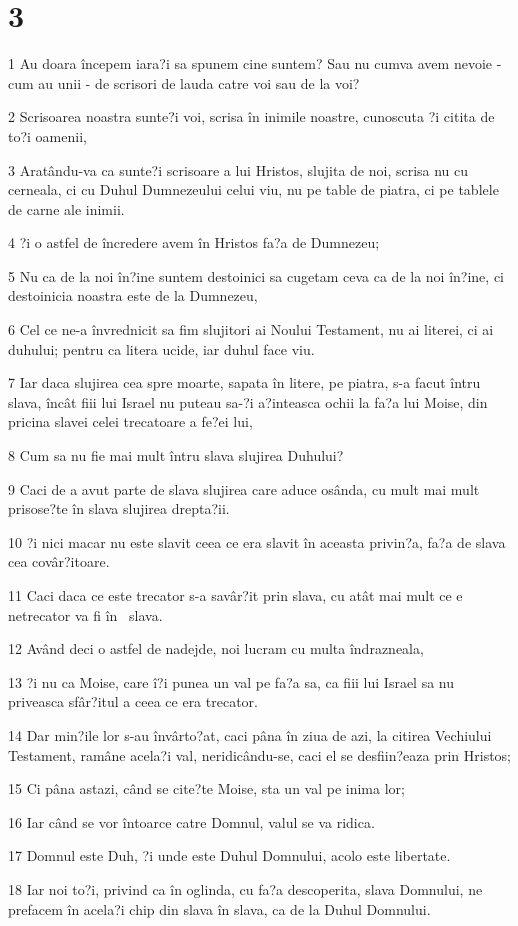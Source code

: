 \chapter{3}

\par 1 Au doara începem iara?i sa spunem cine suntem? Sau nu cumva avem nevoie - cum au unii - de scrisori de lauda catre voi sau de la voi?
\par 2 Scrisoarea noastra sunte?i voi, scrisa în inimile noastre, cunoscuta ?i citita de to?i oamenii,
\par 3 Aratându-va ca sunte?i scrisoare a lui Hristos, slujita de noi, scrisa nu cu cerneala, ci cu Duhul Dumnezeului celui viu, nu pe table de piatra, ci pe tablele de carne ale inimii.
\par 4 ?i o astfel de încredere avem în Hristos fa?a de Dumnezeu;
\par 5 Nu ca de la noi în?ine suntem destoinici sa cugetam ceva ca de la noi în?ine, ci destoinicia noastra este de la Dumnezeu,
\par 6 Cel ce ne-a învrednicit sa fim slujitori ai Noului Testament, nu ai literei, ci ai duhului; pentru ca litera ucide, iar duhul face viu.
\par 7 Iar daca slujirea cea spre moarte, sapata în litere, pe piatra, s-a facut întru slava, încât fiii lui Israel nu puteau sa-?i a?inteasca ochii la fa?a lui Moise, din pricina slavei celei trecatoare a fe?ei lui,
\par 8 Cum sa nu fie mai mult întru slava slujirea Duhului?
\par 9 Caci de a avut parte de slava slujirea care aduce osânda, cu mult mai mult prisose?te în slava slujirea drepta?ii.
\par 10 ?i nici macar nu este slavit ceea ce era slavit în aceasta privin?a, fa?a de slava cea covâr?itoare.
\par 11 Caci daca ce este trecator s-a savâr?it prin slava, cu atât mai mult ce e netrecator va fi în  slava.
\par 12 Având deci o astfel de nadejde, noi lucram cu multa îndrazneala,
\par 13 ?i nu ca Moise, care î?i punea un val pe fa?a sa, ca fiii lui Israel sa nu priveasca sfâr?itul a ceea ce era trecator.
\par 14 Dar min?ile lor s-au învârto?at, caci pâna în ziua de azi, la citirea Vechiului Testament, ramâne acela?i val, neridicându-se, caci el se desfiin?eaza prin Hristos;
\par 15 Ci pâna astazi, când se cite?te Moise, sta un val pe inima lor;
\par 16 Iar când se vor întoarce catre Domnul, valul se va ridica.
\par 17 Domnul este Duh, ?i unde este Duhul Domnului, acolo este libertate.
\par 18 Iar noi to?i, privind ca în oglinda, cu fa?a descoperita, slava Domnului, ne prefacem în acela?i chip din slava în slava, ca de la Duhul Domnului.

